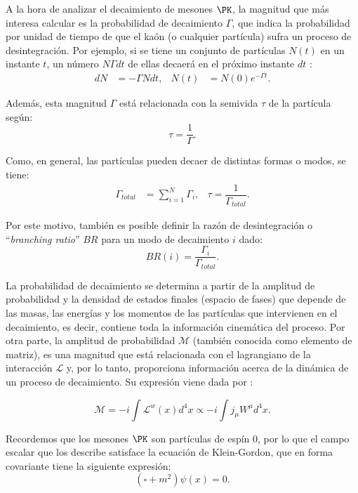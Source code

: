 A la hora de analizar el decaimiento de mesones $\PK$, la magnitud que más interesa calcular es la probabilidad de decaimiento $\Gamma$, que indica la probabilidad por unidad de tiempo de que el kaón (o cualquier partícula) sufra un proceso de desintegración. Por ejemplo, si se tiene un conjunto de partículas $N(t)$ en un instante $t$, un número $N\Gamma dt$ de ellas decaerá en el próximo instante $dt$ \cite{Griffiths2008}:
\begin{align}
dN &= -\Gamma Ndt , & N(t) &= N(0)e^{-\Gamma t} .
\end{align}

Además, esta magnitud $\Gamma$ está relacionada con la semivida $\tau$ de la partícula según:
\begin{equation}
\tau=\dfrac{1}{\Gamma} .\label{eq:meanlife}
\end{equation}

Como, en general, las partículas pueden decaer de distintas formas o modos, se tiene:
\begin{align}
\Gamma_{total} &= \sum_{i=1}^N \Gamma_i , & \tau=\dfrac{1}{\Gamma_{total}}.
\end{align}

Por este motivo, también es posible definir la razón de desintegración o ``\textit{branching ratio}'' $BR$ para un modo de decaimiento $i$ dado:
\begin{equation}
BR(i)=\dfrac{\Gamma_{i}}{\Gamma_{total}} .
\end{equation}

La probabilidad de decaimiento se determina a partir de la amplitud de probabilidad y la densidad de estados finales (espacio de fases) que depende de las masas, las energías y los momentos de las partículas que intervienen en el decaimiento, es decir, contiene toda la información cinemática del proceso. Por otra parte, la amplitud de probabilidad $\mathcal{M}$ (también conocida como elemento de matriz), es una magnitud que está relacionada con el lagrangiano de la interacción $\mathcal{L}$ y, por lo tanto, proporciona información acerca de la dinámica de un proceso de decaimiento. Su expresión viene dada por \cite{Halzen}:

\begin{equation}
\mathcal{M}=-i \int {\mathcal{L}}^w \left(x\right) d^{4}x \propto -i\int j_{\mu }W^{\mu }d^{4}x .\label{eq:defM}
\end{equation}

Recordemos que los mesones $\PK$ son partículas de espín 0, por lo que el campo escalar que los describe satisface la ecuación de Klein-Gordon, que en forma covariante tiene la siguiente expresión:
\begin{equation}
\left( \square +m^{2}\right) \psi \left( x\right) =0 .
\end{equation}

